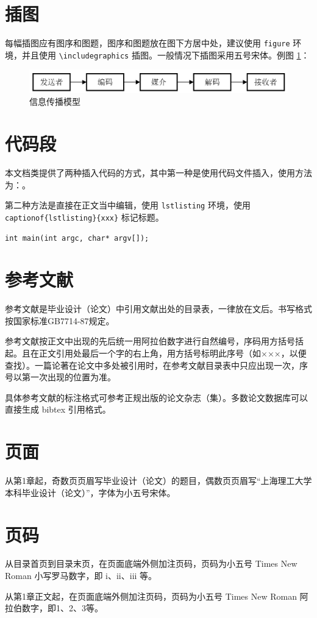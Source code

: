\section{插图}
\par 每幅插图应有图序和图题，图序和图题放在图下方居中处，建议使用 \verb|figure| 环境，并且使用 \verb|\includegraphics| 插图。一般情况下插图采用五号宋体。例图 \ref{figure:model}：

\begin{figure}[htb]
    \figureCapSet
    \centering
    \includegraphics[width=.8\linewidth]{figure/egf.png}
    \caption{信息传播模型}
    \label{figure:model}
\end{figure}

\section{代码段}
\par 本文档类提供了两种插入代码的方式，其中第一种是使用代码文件插入，使用方法为：\lstinline||。


\par 第二种方法是直接在正文当中编辑，使用 \lstinline|lstlisting| 环境，使用 \lstinline|captionof{lstlisting}{xxx}| 标记标题。
\begin{lstlisting}
int main(int argc, char* argv[]);
\end{lstlisting}

\section{参考文献}
\par 参考文献是毕业设计（论文）中引用文献出处的目录表，一律放在文后。书写格式按国家标准GB7714-87规定。
\par 参考文献按正文中出现的先后统一用阿拉伯数字进行自然编号，序码用方括号括起。且在正文引用处最后一个字的右上角，用方括号标明此序号（如×××\cite{论文}，以便查找）。一篇论著在论文中多处被引用时，在参考文献目录表中只应出现一次，序号以第一次出现的位置为准。
\par 具体参考文献的标注格式可参考正规出版的论文杂志（集）。多数论文数据库可以直接生成 bibtex 引用格式。

\section{页面}
\par 从第1章起，奇数页页眉写毕业设计（论文）的题目，偶数页页眉写“上海理工大学本科毕业设计（论文）”，字体为小五号宋体。

\section{页码}
\par 从目录首页到目录末页，在页面底端外侧加注页码，页码为小五号 Times New Roman 小写罗马数字，即 i、ii、iii 等。
\par 从第1章正文起，在页面底端外侧加注页码，页码为小五号 Times New Roman 阿拉伯数字，即1、2、3等。

